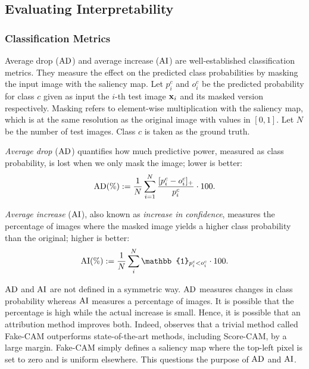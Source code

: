 \subsection*{Evaluating Interpretability}
\subsubsection*{Classification Metrics}
Average drop ($\operatorname{AD}$) and average increase ($\operatorname{AI}$) \autocite{chattopadhay2018grad} are 
well-established classification metrics. 
They measure the effect on the predicted class probabilities by masking the input image with the
 saliency map. Let $p^c_i$ and $o^c_i$ be the predicted probability for class $c$ given as input 
 the $i$-th test image $\mathbf{x}_i$ and its masked version respectively. 
Masking refers to element-wise multiplication with the saliency map, which is at the same 
resolution as the original image with values in $[0,1]$. 
Let $N$ be the number of test images. Class $c$ is taken as the ground truth.

\emph{Average drop} ($\operatorname{AD}$) quantifies how much predictive power, measured as class probability, 
is lost when we only mask the image; lower is better:
\begin{equation}
	\operatorname{AD}(\%) \mathrel{:=} \frac{1}{N} \sum_{i=1}^N \frac{[p^c_i - o^c_i]_+}{p^c_i} \cdot 100.
\label{eq:ad}
\end{equation}

\emph{Average increase} ($\operatorname{AI}$), also known as \emph{increase in confidence}, measures the 
percentage of images where the masked image yields a higher class probability than the original; 
higher is better:
\begin{equation}
	\AI(\%) \defn \frac{1}{N} \sum_i^N \mathbb{1}_{p^c_i < o^c_i} \cdot 100.
\label{eq:ai}
\end{equation}

$\operatorname{AD}$ and $\operatorname{AI}$ are not defined in a symmetric way. $\operatorname{AD}$ measures changes in class probability 
whereas $\operatorname{AI}$ measures a percentage of images. It is possible that the percentage is high while 
the actual increase is small. Hence, it is possible that an attribution method improves both. 
Indeed, \autocite{poppi2021revisiting} observes that a trivial method called Fake-CAM outperforms 
state-of-the-art methods, including Score-CAM, by a large margin. Fake-CAM simply defines a 
saliency map where the top-left pixel is set to zero and is uniform elsewhere. 
This questions the purpose of $\operatorname{AD}$ and $\operatorname{AI}$.

